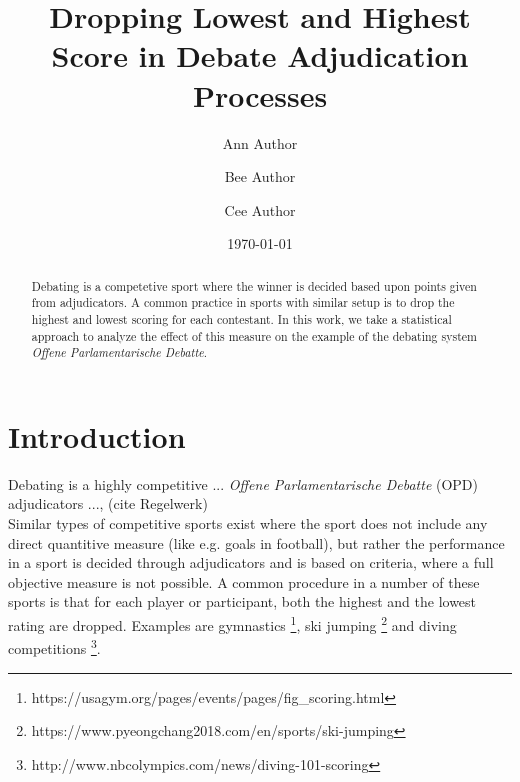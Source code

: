 \documentclass[%
 reprint,
 amsmath,amssymb,
 aps,
]{revtex4-1}
\begin{document}

\title{Dropping Lowest and Highest Score in Debate Adjudication Processes}%


\author{Ann Author}
 
\author{Bee Author}%
%

\author{Cee Author}%
%

\date{\today}%

\begin{abstract}
Debating is a competetive sport where the winner is decided based upon points given from adjudicators. A common practice in sports with similar setup is to drop the highest and lowest scoring for each contestant. In this work, we take a statistical approach to analyze the effect of this measure on the example of the debating system \textit{Offene Parlamentarische Debatte}.
\end{abstract}

\maketitle


\section{\label{sec:level1}Introduction}

Debating is a highly competitive ... \textit{Offene Parlamentarische Debatte} (OPD) adjudicators ..., (cite Regelwerk)\\

Similar types of competitive sports exist where the sport does not include any direct quantitive measure (like e.g. goals in football), but rather the performance in a sport is decided through adjudicators and is based on criteria, where a full objective measure is not possible. A common procedure in a number of these sports is that for each player or participant, both the highest and the lowest rating are dropped. Examples are gymnastics \footnote{https://usagym.org/pages/events/pages/fig\_scoring.html}, ski jumping \footnote{https://www.pyeongchang2018.com/en/sports/ski-jumping} and diving competitions \footnote{http://www.nbcolympics.com/news/diving-101-scoring}. \\
\end{document}
